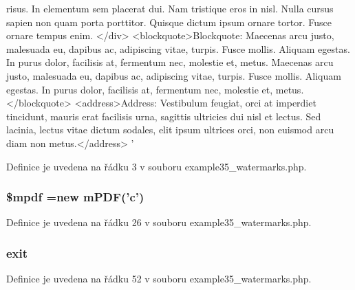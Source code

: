 \begin{DoxyCode}
{       risus. In elementum sem placerat dui. Nam tristique eros in nisl. Nulla cursus sapien non quam porta
       porttitor. Quisque dictum ipsum ornare tortor. Fusce ornare tempus enim. </div>}
\textcolor{stringliteral}{}
\textcolor{stringliteral}{<blockquote>Blockquote: Maecenas arcu justo, malesuada eu, dapibus ac, adipiscing vitae, turpis. Fusce
       mollis. Aliquam egestas. In purus dolor, facilisis at, fermentum nec, molestie et, metus. Maecenas arcu justo,
       malesuada eu, dapibus ac, adipiscing vitae, turpis. Fusce mollis. Aliquam egestas. In purus dolor, facilisis
       at, fermentum nec, molestie et, metus.</blockquote>}
\textcolor{stringliteral}{}
\textcolor{stringliteral}{<address>Address: Vestibulum feugiat, orci at imperdiet tincidunt, mauris erat facilisis urna, sagittis
       ultricies dui nisl et lectus. Sed lacinia, lectus vitae dictum sodales, elit ipsum ultrices orci, non euismod
       arcu diam non metus.</address>}
\textcolor{stringliteral}{}
\textcolor{stringliteral}{'}
\end{DoxyCode}


Definice je uvedena na řádku 3 v souboru example35\-\_\-watermarks.\-php.

\hypertarget{example35__watermarks_8php_ad028f81910d6cbab9b184d2214b3a8f8}{
\subsubsection[{\$mpdf}]{\setlength{\rightskip}{0pt plus 5cm}\$mpdf =new {\bf m\-P\-D\-F}('c')}}\label{example35__watermarks_8php_ad028f81910d6cbab9b184d2214b3a8f8}


Definice je uvedena na řádku 26 v souboru example35\-\_\-watermarks.\-php.

\hypertarget{example35__watermarks_8php_a6733eb5f605d09eaede9845835d71c4e}{
\subsubsection[{exit}]{\setlength{\rightskip}{0pt plus 5cm}exit}}\label{example35__watermarks_8php_a6733eb5f605d09eaede9845835d71c4e}


Definice je uvedena na řádku 52 v souboru example35\-\_\-watermarks.\-php.

